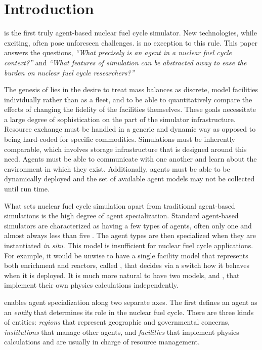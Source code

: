 \section{Introduction}
\label{sec-intro}

\Cyclus \cite{cyclus_v1_0,cyclus_v1_2,huff_fundamental_2016} is the first truly agent-based 
\cite{jennings2000agent} nuclear fuel cycle simulator. 
New technologies, while exciting, often pose unforeseen challenges.
\Cyclus is no exception to this rule.  This paper answers the questions,
\emph{``What precisely is an agent in a nuclear fuel cycle context?''} and 
\emph{``What features of simulation can be abstracted away to ease the burden 
on nuclear fuel cycle researchers?''}

The genesis of \cyclus lies in the desire to 
treat mass balances as discrete, model facilities individually rather than as 
a fleet, and to be able to quantitatively compare the effects of changing the 
fidelity of the facilities themselves. These goals necessitate a large degree of 
sophistication on the part of the simulator infrastructure.  Resource exchange
must be handled in a generic and dynamic way as opposed to being hard-coded 
for specific commodities. Simulations must be inherently comparable, which involves 
storage infrastructure that is designed around this need. Agents must be able 
to communicate with one another and learn about the environment in which they 
exist. Additionally, agents must be able to be dynamically deployed and the set of 
available agent models may not be collected until run time. 

What sets nuclear fuel cycle simulation apart from traditional agent-based simulations 
is the high degree of agent specialization. Standard agent-based simulators
are characterized as having a few types of agents, often only one and 
almost always less than five \cite{taylor2014agent}. The agent types are then 
specialized 
when they are instantiated \emph{in situ}. This model is insufficient for 
nuclear fuel cycle applications.  For example, it would be unwise to have a single facility model 
that represents both enrichment and reactors, called ,
that decides via a switch how it behaves when it is deployed. It is much 
more natural to have two models,  and , 
that implement their own physics calculations independently.

\Cyclus enables agent specialization along two separate axes. The first defines 
an agent as an \emph{entity} that determines its role in the 
nuclear fuel cycle. There are three kinds of entities: \emph{regions} that 
represent geographic and governmental concerns, \emph{institutions} 
that manage other agents, and \emph{facilities} that implement 
physics calculations and are usually in charge of resource management.

